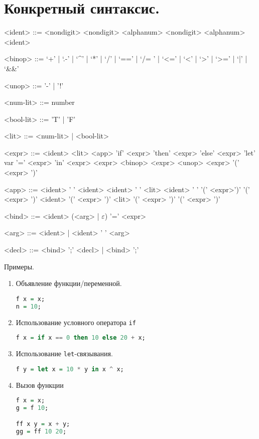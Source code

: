 \documentclass[12pt, a4paper] {ncc}
\begin{document}
\setcounter{figure}{0}

\section{Конкретный синтаксис.}
\begin{grammar}
<ident> ::= <nondigit> \alt <nondigit> <alphanum> \alt <nondigit> <alphanum> <ident>

<binop> ::= `+' | `.-' | `^' | `*' | `/' | `==' | `/= ' | `<=' | `<' | `>' | `>=' | `|' | `\&\&'

<unop> ::= '-' | '!'

<num-lit> ::= number

<bool-lit> ::= 'T' | 'F'

<lit> ::= <num-lit> | <bool-lit>

<expr> ::= <ident>
\alt <lit>
\alt <app>
\alt 'if' <expr> 'then' <expr> 'else' <expr>
\alt 'let' var '=' <expr> 'in' <expr>
\alt  <expr> <binop> <expr>
\alt <unop> <expr>
\alt '(' <expr> ')'

<app> ::=  <ident> ' ' <ident>
\alt <ident> ' ' <lit>
\alt <ident> ' ' '(' <expr>')'
\alt '(' <expr> ')' <ident>
\alt '(' <expr> ')' <lit>
\alt '(' <expr> ')' '(' <expr> ')'

<bind> ::= <ident> (<arg> | $\varepsilon$) '=' <expr>

<arg> ::= <ident> | <ident> ' ' <arg>

<decl> ::= <bind> ';' <decl> | <bind> ';'

\end{grammar}

Примеры.
\begin{enumerate}
\item Объявление функции/переменной.
\begin{lstlisting}[language=Haskell]
f x = x;
n = 10;
\end{lstlisting}
\item Использование условного оператора \texttt{if}
\begin{lstlisting}[language=Haskell]
f x = if x == 0 then 10 else 20 + x;
\end{lstlisting}

\item Использование \texttt{let}-связывания.
\begin{lstlisting}[language=Haskell]
f y = let x = 10 * y in x ^ x;
\end{lstlisting}
\item Вызов функции
\begin{lstlisting}[language=Haskell]
f x = x;
g = f 10;

ff x y = x + y;
gg = ff 10 20;
\end{lstlisting}
\end{enumerate}
\end{document}

